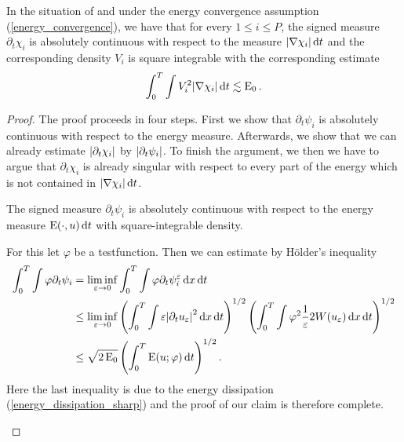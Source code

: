 \begin{proposition}
	In the situation of  and under the energy convergence assumption (\ref{energy_convergence}), we have that for every $ 1 \leq i \leq P $, the signed measure $ \partial_{ t } \chi_{ i } $ is absolutely continuous with respect to the measure $ \abs{ \nabla \chi_{i } } \dd{ t } $ and the corresponding density $ V_{ i } $ is square integrable with the corresponding estimate
	\begin{equation}
		\label{velocity_l2_estimate}
		\int_{ 0 }^{ T }
			\int
				V_{ i }^{ 2 }
			\abs{ \nabla \chi_{ i } }
		\dd{ t }
		\lesssim
		\operatorname{E}_{ 0 }.
	\end{equation}
\end{proposition}

\begin{proof}
	The proof proceeds in four steps. First we show that $ \partial_{ t } \psi_{ i } $ is absolutely continuous with respect to the energy measure. Afterwards, we show that we can already estimate $ \abs{ \partial_{ t } \chi_{ i } } $ by $ \abs{ \partial_{ t } \psi_{ i } } $. To finish the argument, we then we have to argue that $ \partial_{ t } \chi_{ i } $ is already singular with respect to every part of the energy which is not contained in $ \abs{ \nabla \chi_{ i } } \dd{ t } $.
	 
	\begin{description}[wide=0pt]
		\item[Step 1:] The signed measure $ \partial_{  t } \psi_{ i } $ is absolutely continuous with respect to the energy measure $ \operatorname{E} ( \cdot, u ) \dd{t } $ with square-integrable density.
		
		For this let $ \varphi $ be a testfunction. Then we can estimate by Hölder's inequality
		\begin{align*}
			\int_{ 0 }^{ T }
				\int
					\varphi
					\partial_{ t } \psi_{ i }
			& =
			\liminf_{ \varepsilon \to 0 }
				\int_{ 0 }^{ T }
					\int
						\varphi
						\partial_{ t } \psi_{ i }^{ \varepsilon }
					\dd{ x }
				\dd{ t }
			\\
			& \leq
			\liminf_{ \varepsilon \to 0 }
				\left(
					\int_{ 0 }^{ T }
						\int
							\varepsilon 
							\abs{ \partial_{ t } u_{ \varepsilon } }^{ 2 }
						\dd{ x }
					\dd{ t }
				\right)^{ 1/2 }
				\left(
					\int_{ 0 }^{ T }
						\int
							\varphi^{ 2 }
							\frac{ 1 }{ \varepsilon }
							2 W ( u_{ \varepsilon } )
						\dd{ x }
					\dd{ t }
				\right)^{ 1/2 }
			\\
			& \leq
			\sqrt{ 2 \operatorname{E}_{ 0 } }
			\left(
				\int_{ 0 }^{ T }
					\operatorname{E} ( u ; \varphi )
				\dd{ t }
			\right)^{ 1/2 }.
		\end{align*}
		Here the last inequality is due to the energy dissipation (\ref{energy_dissipation_sharp})
		and the proof of our claim is therefore complete.
		

\end{description}
\end{proof}
